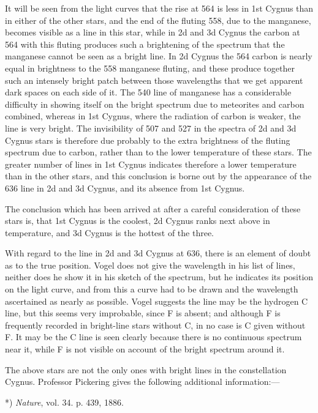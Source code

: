 \documentclass[a4paper, 12pt, oneside, polutonikogreek, english]{article}
\begin{document}
It will be seen from the light curves that the rise at 564 is less in 1st Cygnus than in either of the other stars, and the end of the fluting 558, due to the manganese, becomes visible as a line in this star, while in 2d and 3d Cygnus the carbon at 564 with this fluting produces such a brightening of the spectrum that the manganese cannot be seen as a bright line. In 2d Cygnus the 564 carbon is nearly equal in brightness to the 558 manganese fluting, and these produce together such an intensely bright patch between those wavelengths that we get apparent dark spaces on each side of it. The 540 line of manganese has a considerable difficulty in showing itself on the bright spectrum due to meteorites and carbon combined, whereas in 1st Cygnus, where the radiation of carbon is weaker, the line is very bright. The invisibility of 507 and 527 in the spectra of 2d and 3d Cygnus stars is therefore due probably to the extra brightness of the fluting spectrum due to carbon, rather than to the lower temperature of these stars. The greater number of lines in 1st Cygnus indicates therefore a lower temperature than in the other stars, and this conclusion is borne out by the appearance of the 636 line in 2d and 3d Cygnus, and its absence from 1st Cygnus.

The conclusion which has been arrived at after a careful consideration of these stars is, that 1st Cygnus is the coolest, 2d Cygnus ranks next above in temperature, and 3d Cygnus is the hottest of the three.

With regard to the line in 2d and 3d Cygnus at 636, there is an element of doubt as to the true position. Vogel does not give the wavelength in his list of lines, neither does he show it in his sketch of the spectrum, but he indicates its position on the light curve, and from this a curve had to be drawn and the wavelength ascertained as nearly as possible. Vogel suggests the line may be the hydrogen C line, but this seems very improbable, since F is absent; and although F is frequently recorded in bright-line stars without C, in no case is C given without F. It may be the C line is seen clearly because there is no continuous spectrum near it, while F is not visible on account of the bright spectrum around it.

The above stars are not the only ones with bright lines in the constellation Cygnus. Professor Pickering gives the following additional information:---

*) \emph{Nature}, vol. 34. p. 439, 1886.
\end{document}
